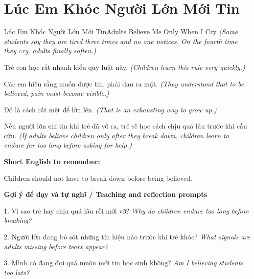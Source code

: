 \section{Lúc Em Khóc Người Lớn Mới Tin}
\begin{truyen}{Lúc Em Khóc Người Lớn Mới Tin}{Adults Believe Me Only When I Cry}
\textit{(Some students say they are tired three times and no one notices. On the fourth time they cry, adults finally soften.)}

Trẻ con học rất nhanh kiểu quy luật này.
\textit{(Children learn this rule very quickly.)}

Các em hiểu rằng muốn được tin, phải đau ra mặt.
\textit{(They understand that to be believed, pain must become visible.)}

Đó là cách rất mệt để lớn lên.
\textit{(That is an exhausting way to grow up.)}

\end{truyen}

\begin{baihoc}
Nếu người lớn chỉ tin khi trẻ đã vỡ ra, trẻ sẽ học cách chịu quá lâu trước khi cầu cứu.
\textit{(If adults believe children only after they break down, children learn to endure far too long before asking for help.)}
\end{baihoc}

\begin{ghinhoanh}
\textbf{Short English to remember:}

Children should not have to break down before being believed.

\end{ghinhoanh}

\begin{tuhocnhanh}
\textbf{Gợi ý để dạy và tự nghĩ / Teaching and reflection prompts}

1. Vì sao trẻ hay chịu quá lâu rồi mới vỡ? \textit{Why do children endure too long before breaking?}

2. Người lớn đang bỏ sót những tín hiệu nào trước khi trẻ khóc? \textit{What signals are adults missing before tears appear?}

3. Mình có đang đợi quá muộn mới tin học sinh không? \textit{Am I believing students too late?}
\end{tuhocnhanh}
\ngancach

